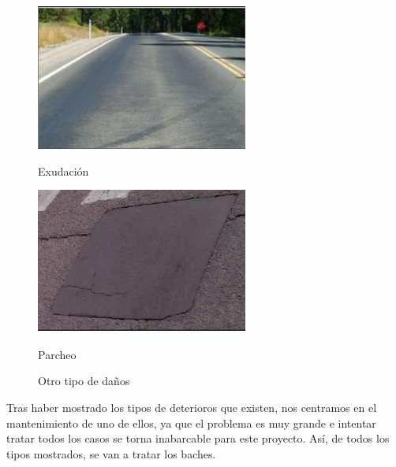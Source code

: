 \begin{figure}[ht!]
	\centering
	\begin{minipage}{0.3\linewidth}
		\centering
		\includegraphics[width=\linewidth]{figs/ex.png}
		\caption*{\centering Exudación }
	\end{minipage}
	\hspace{3 cm}
	\begin{minipage}{0.3\linewidth}
		\centering
		\includegraphics[width=\linewidth]{figs/parcheo.png}
		\caption*{\centering Parcheo }
	\end{minipage}
	
	\caption{Otro tipo de daños}
	\label{fig:otro}
\end{figure}

Tras haber mostrado los tipos de deterioros que existen, nos centramos en el mantenimiento de uno de ellos, ya que el problema es muy grande e intentar tratar todos los casos se torna inabarcable para este proyecto. Así, de todos los tipos mostrados, se van a tratar los baches.\\\\\\  %

